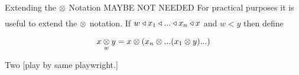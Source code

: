 \newcommand{\inningsCrossSide}{\crossx{innings\kern-0.3cm}{\kern-0.3cm side}{match}}
\newcommand{\inningsCrossPlayer}{\crossx{innings\kern-0.3cm}{\kern-0.3cm player}{match}}
\newcommand{\fieldingSidePlayer}{fieldingSide ^* (\inningsCrossPlayer)}
\newcommand{\battingSidePlayer}{battingSide ^* (\inningsCrossPlayer)}
\newcommand{\overCrossFieldingSidePlayer}{\crossx{over\kern-0.4cm}{\kern-0.4cm(\fieldingSidePlayer)}{innings}}
\newcommand{\deliveryCrossBattingSidePlayer}{\crossx{delivery\kern-0.4cm}{\kern-0.4cm (\battingSidePlayer)}{innings}}

\begin{frame}{Extending the $\crossx{}{}{}$ Notation}
MAYBE NOT NEEDED
For practical purposes it is useful to extend the $\crossx{}{}{}$ notation.
If $w \base x_1 \base ... \base x_n \base x$
and $w < y$ then define 
$$\crossx{x}{y}{w}=x \cross ( x_n \cross ... (x_1 \cross y)...)$$

Two [play by same playwright.]
\end{frame}

